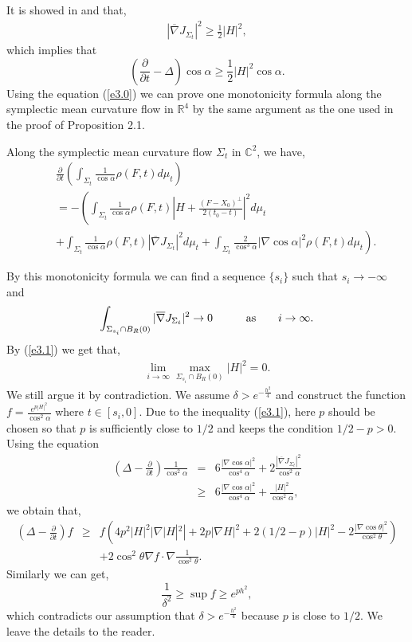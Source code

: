 It is showed in \cite{CT} and \cite{CL1} that,
\begin{eqnarray}\label{e3.1}
|\overline\nabla J_{\Sigma_t}|^2 \geq
\frac{1}{2}|H|^2,\end{eqnarray} which implies that
$$ (\frac{\partial}{\partial t}-\Delta)\cos\alpha\geq \frac{1}{2}|H|^2\cos\alpha.
$$
Using the equation (\ref{e3.0}) we can prove one monotonicity
formula along the symplectic mean curvature flow in
${\mathbb{R}}^4$ by the same argument as the one used in the proof
of Proposition 2.1.
\begin{proposition}\label{mono2}
Along the symplectic mean curvature flow $\Sigma_t$ in
${\mathbb{C}}^2$, we have,
\begin{eqnarray*}
&&\frac{\partial}{\partial
t}\left(\int_{\Sigma_t}\frac{1}{\cos\alpha} \rho(F,
t)d\mu_t\right)\nonumber\\&&= -\left(
\int_{\Sigma_t}\frac{1}{\cos\alpha}\rho (F, t)
\left|H+\frac{(F-X_0)^{\perp}}{2(t_0-t)}\right|^2d\mu_t \right.\nonumber \\
&&\left.+ \int_{\Sigma_t}\frac{1}{\cos\alpha}\rho (F,
t)|\overline\nabla J_{\Sigma_t}|^2d\mu_t
+\int_{\Sigma_t}\frac{2}{\cos^3\alpha}\left|\nabla
\cos\alpha\right|^2\rho (F, t)d\mu_t\right).
\end{eqnarray*}
\end{proposition}
By this monotonicity formula we can find a sequence $\{s_i\}$ such
that $s_i\to-\infty$ and
$$\int_{\Sigma_{s_i}\cap B_R(0)}|\overline\nabla
J_{\Sigma_t}|^2\to 0~~~~~~~~~{\rm as}~~~~~~i\to \infty.
$$ By (\ref{e3.1}) we get that,
\begin{eqnarray}\label{e3.2}\lim_{i\to \infty}\max_{\Sigma_{s_i}\cap B_R(0)}|H|^2=0.
\end{eqnarray} We still argue it by contradiction. We assume $\delta>e^{-\frac{h^2}{4}}$
and construct the  function $f=\frac{e^{p|H|^2}}{\cos^2\alpha}$
where $t\in [s_i, 0]$. Due to the inequality (\ref{e3.1}), here
$p$ should be chosen so that $p$ is sufficiently close to $1/2$
and keeps the condition $1/2-p>0$. Using the equation
\begin{eqnarray*}
(\Delta-\frac{\partial}{\partial t})\frac{1}{\cos^2\alpha}
&=&6\frac{|\nabla\cos\alpha|^2}{\cos^4\alpha}+2\frac{|\overline\nabla
J_{\Sigma_t}|^2}{\cos^2\alpha}\\ &\geq& 6
\frac{|\nabla\cos\alpha|^2}{\cos^4\alpha}+\frac{|H|^2}{\cos^2\alpha},
\end{eqnarray*} we obtain that,
\begin{eqnarray}\label{e3.2}
(\Delta-\frac{\partial}{\partial t})f &\geq& f(4p^2|H|^2|\nabla
|H|^2|+2p|\nabla
H|^2+2(1/2-p)|H|^2-2\frac{|\nabla\cos\theta|^2}{\cos^2\theta})
\nonumber\\ &&+2\cos^2\theta\nabla
f\cdot\nabla\frac{1}{\cos^2\theta}.
\end{eqnarray} Similarly we can get,
$$\frac{1}{\delta^2}\geq \sup f\geq e^{ph^2},$$ which
contradicts our assumption that $\delta>e^{-\frac{h^2}{4}}$
because $p$ is close to $1/2$. We leave the details to the reader.

